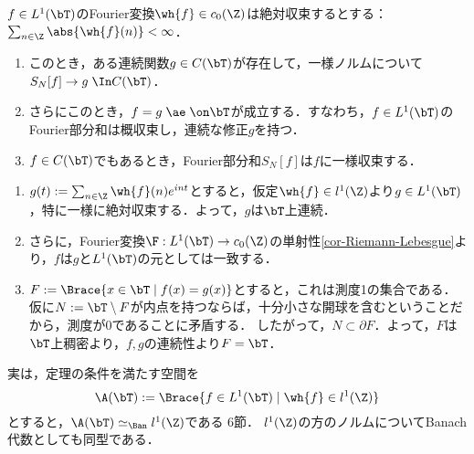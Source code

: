 \documentclass[uplatex,dvipdfmx]{jsreport}
\begin{document}
\begin{theorem}[Fourier級数が絶対収束するならば部分和は一様収束する]\label{thm-l1-series}
    $f\in L^1(\bT)$のFourier変換$\wh{f}\in c_0(\Z)$は絶対収束するとする：$\sum_{n\in\Z}\abs{\wh{f}(n)}<\infty$．
    \begin{enumerate}
        \item このとき，ある連続関数$g\in C(\bT)$が存在して，一様ノルムについて$S_N[f]\to g\;\In C(\bT)$．
        \item さらにこのとき，$f=g\;\ae\;\on\bT$が成立する．すなわち，$f\in L^1(\bT)$のFourier部分和は概収束し，連続な修正$g$を持つ．
        \item $f\in C(\bT)$でもあるとき，Fourier部分和$S_N[f]$は$f$に一様収束する．
    \end{enumerate}
\end{theorem}
\begin{Proof}\mbox{}
    \begin{enumerate}
        \item $g(t):=\sum_{n\in\Z}\wh{f}(n)e^{int}$とすると，仮定$\wh{f}\in l^1(\Z)$より$g\in L^1(\bT)$，特に一様に絶対収束する．よって，$g$は$\bT$上連続．
        \item さらに，Fourier変換$\F:L^1(\bT)\to c_0(\Z)$の単射性\ref{cor-Riemann-Lebesgue}より，$f$は$g$と$L^1(\bT)$の元としては一致する．
        \item $F:=\Brace{x\in\bT\mid f(x)=g(x)}$とすると，これは測度1の集合である．仮に$N:=\bT\setminus F$が内点を持つならば，十分小さな開球を含むということだから，測度が$0$であることに矛盾する．
        したがって，$N\subset\partial F$．よって，$F$は$\bT$上稠密より，$f,g$の連続性より$F=\bT$．
    \end{enumerate}
\end{Proof}
\begin{remarks}
    実は，定理の条件を満たす空間を
    \[\A(\bT):=\Brace{f\in L^1(\bT)\mid\wh{f}\in l^1(\Z)}\]
    とすると，$\A(\bT)\simeq_\Ban l^1(\Z)$である\cite{Katznelson-Fourier} 6節．
    $l^1(\Z)$の方のノルムについてBanach代数としても同型である．
\end{remarks}
\end{document}
